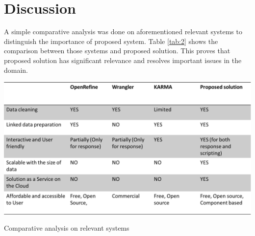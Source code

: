 \section{Discussion}
A simple comparative analysis was done on aforementioned relevant systems to distinguish the importance of proposed system. Table \ref{tab:2} shows the comparison between those systems and proposed solution. This proves that proposed solution has significant relevance and resolves important issues in the domain. 
\begin{center}
	\includegraphics[width=38em]{./Figures/comparative_analysis}
	\begin{table}[htbp]
    \caption{Comparative analysis on relevant systems}
    \label{tab:2}
	\end{table}
\end{center}
